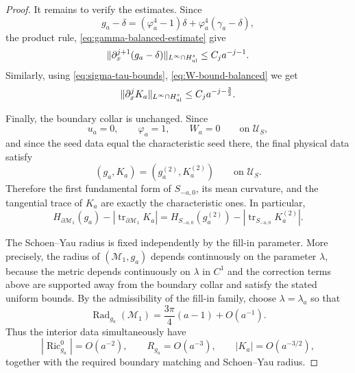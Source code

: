 \documentclass{amsart}
\begin{document}
{\begin{proof}
\noindent It remains to verify the estimates. Since
\[
        g_a-\delta
        =
        (\varphi_a^4-1)\delta
        +
        \varphi_a^4(\gamma_a-\delta),
\]
the product rule, \eqref{eq:gamma-balanced-estimate} give
\[
        \|\partial_x^{j+1}(g_a-\delta)\|_{L^\infty\cap H^s_{\rm ul}}
        \le C_j a^{-j-1}.
\]
Similarly, using \eqref{eq:sigma-tau-bounds},
\eqref{eq:W-bound-balanced} we get
\[
        \|\partial_x^jK_a\|_{L^\infty\cap H^s_{\rm ul}}
        \le C_j a^{-j-\frac32}.
\]

\noindent Finally, the boundary collar is unchanged. Since
\[
        u_a=0,\qquad
        \varphi_a=1,\qquad
        W_a=0
        \qquad\text{on }\mathcal U_S,
\]
and since the seed data equal the characteristic seed there, the final
physical data satisfy
\[
        (g_a,K_a)=(g_a^{(2)},K_a^{(2)})
        \qquad\text{on }\mathcal U_S.
\]
Therefore the first fundamental form of \(S_{-a,0}\), its mean
curvature, and the tangential trace of \(K_a\) are exactly the
characteristic ones. In particular,
\[
        H_{\partial\mathcal M_1}(g_a)
        -
        \left|
        \operatorname{tr}_{\partial\mathcal M_1}K_a
        \right|
        =
        H_{S_{-a,0}}(g_a^{(2)})
        -
        \left|
        \operatorname{tr}_{S_{-a,0}}K_a^{(2)}
        \right|.
\]

\noindent The Schoen--Yau radius is fixed independently by the fill-in parameter.
More precisely, the radius of \((\mathcal M_1,g_a)\) depends
continuously on the parameter \(\lambda\), because the metric depends
continuously on \(\lambda\) in \(C^1\) and the correction terms above
are supported away from the boundary collar and satisfy the stated
uniform bounds. By the admissibility of the fill-in family, choose
\(\lambda=\lambda_a\) so that
\[
        \operatorname{Rad}_{g_a}(\mathcal M_1)
        =
        \frac{3\pi}{4}(a-1)+O(a^{-1}).
\]
Thus the interior data simultaneously have
\[
        |\operatorname{Ric}^0_{g_a}|=O(a^{-2}),
        \qquad
        R_{g_a}=O(a^{-3}),
        \qquad
        |K_a|=O(a^{-3/2}),
\]
together with the required boundary matching and Schoen--Yau radius.
























\end{proof}}
\end{document}

